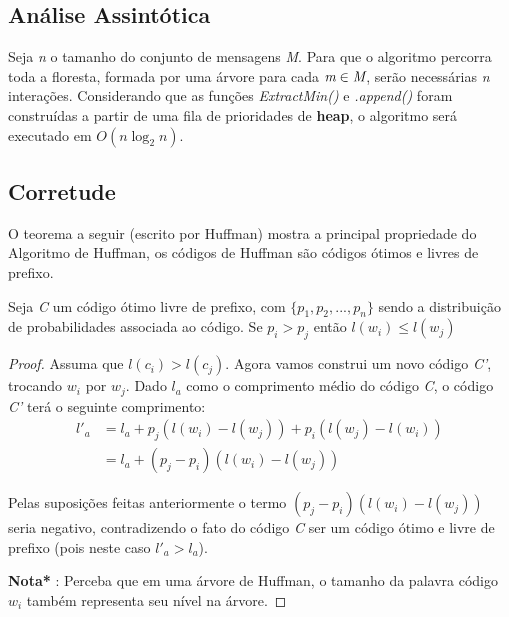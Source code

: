 \subsection{Análise Assintótica}
Seja \emph{n} o tamanho do conjunto de mensagens \emph{M}. Para que o algoritmo percorra toda a floresta, formada por uma árvore para cada $\emph{m} \in \emph{M}$, serão necessárias \emph{n} interações.
Considerando que as funções \emph{ExtractMin()} e \emph{.append()} foram construídas a partir de uma fila de prioridades de \textbf{heap}, o algoritmo será executado em  $O(n \log_2 n)$.

\subsection{Corretude}
O teorema a seguir (escrito por Huffman) mostra a principal propriedade do Algoritmo de Huffman, os códigos de Huffman são códigos ótimos e livres de prefixo.


\begin{lemma} \label{lemma:dist_prob_avg_size} Seja \emph{C} um código ótimo livre de prefixo, com $\{ p_1, p_2,..., p_n\}$ sendo a distribuição de probabilidades associada ao código. Se $p_i > p_j$ então $l(w_i) \leq l(w_j)$

\begin{proof} 
Assuma que $l(c_i) > l(c_j)$. Agora vamos construi um novo código \emph{C'}, trocando $w_i$ por $w_j$. Dado $l_a$ como o comprimento médio do código \emph{C}, o código \emph{C'} terá o seguinte comprimento:
\begin{align*}
l'_a &= l_a + p_j(l(w_i) - l(w_j)) + p_i(l(w_j) - l(w_i)) \\
&= l_a + (p_j - p_i)(l(w_i) - l(w_j)) 
\end{align*}

Pelas suposições feitas anteriormente o termo $(p_j - p_i)(l(w_i) - l(w_j))$ seria negativo, contradizendo o fato do código \emph{C} ser um código ótimo e livre de prefixo (pois neste caso $l'_a > l_a$).

\textbf{Nota*} : Perceba que em uma árvore de Huffman, o tamanho da palavra código $w_i$ também representa seu nível na árvore.
\end{proof}
\end{lemma}

